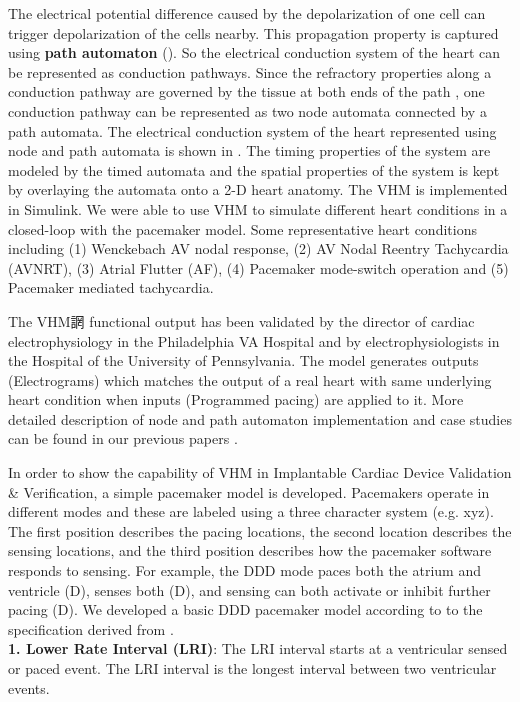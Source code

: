 The electrical potential difference caused by the depolarization of one cell can trigger depolarization of the cells nearby. This propagation property is captured using \textbf{path automaton} (). So the electrical conduction system of the heart can be represented as conduction pathways. Since the refractory properties along a conduction pathway are governed by the tissue at both ends of the path \cite{josephson}, one conduction pathway can be represented as two node automata connected by a path automata. The electrical conduction system of the heart represented using node and path automata is shown in . The timing properties of the system are modeled by the timed automata and the spatial properties of the system is kept by overlaying the automata onto a 2-D heart anatomy. The VHM is implemented in Simulink. We were able to use VHM to simulate different heart conditions in a closed-loop with the pacemaker model. Some representative heart conditions including (1) Wenckebach AV nodal response, (2) AV Nodal Reentry Tachycardia (AVNRT), (3) Atrial Flutter (AF), (4) Pacemaker mode-switch operation and (5) Pacemaker mediated tachycardia.

The VHM誷 functional output has been validated by the director of cardiac electrophysiology in the Philadelphia VA Hospital and by electrophysiologists in the Hospital of the University of Pennsylvania. The model generates outputs (Electrograms) which matches the output of a real heart with same underlying heart condition when inputs (Programmed pacing) are applied to it. More detailed description of node and path automaton implementation and case studies can be found in our previous papers \cite{Jiang1}\cite{vhm_iccps11}\cite{embc10}.


In order to show the capability of VHM in Implantable Cardiac Device Validation \& Verification, a simple pacemaker model is developed. Pacemakers operate in different modes and these are labeled using a three character system (e.g. xyz). The first position describes the pacing locations, the second location describes the sensing locations, and the third position describes how the pacemaker software responds to sensing. For example, the DDD mode paces both the atrium and ventricle (D), senses both (D), and sensing can both activate or inhibit further pacing (D). We developed a basic DDD pacemaker model according to  to the specification derived from \cite{challenge}.\\
\textbf{1. Lower Rate Interval (LRI)}:
The LRI interval starts at a ventricular sensed or paced event. The LRI interval is the longest interval between two ventricular events. 

